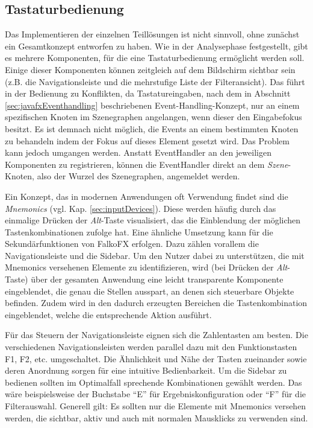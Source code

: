 \subsection{Tastaturbedienung} \label{sec:interactionKeyboard}
Das Implementieren der einzelnen Teillösungen ist nicht sinnvoll, ohne zunächst ein Gesamtkonzept entworfen zu haben. Wie in der Analysephase festgestellt, gibt es mehrere Komponenten, für die eine Tastaturbedienung ermöglicht werden soll. Einige dieser Komponenten können zeitgleich auf dem Bildschirm sichtbar sein (z.B. die Navigationsleiste und die mehrstufige Liste der Filteransicht). Das führt in der Bedienung zu Konflikten, da Tastatureingaben, nach dem in Abschnitt \ref{sec:javafxEventhandling} beschriebenen Event-Handling-Konzept, nur an einem spezifischen Knoten im Szenegraphen angelangen, wenn dieser den Eingabefokus besitzt. Es ist demnach nicht möglich, die Events an einem bestimmten Knoten zu behandeln indem der Fokus auf dieses Element gesetzt wird. Das Problem kann jedoch umgangen werden. Anstatt EventHandler an den jeweiligen Komponenten zu registrieren, können die EventHandler direkt an dem \textit{Szene}-Knoten, also der Wurzel des Szenegraphen, angemeldet werden.\par
{}
Ein Konzept, das in modernen Anwendungen oft Verwendung findet sind die \textit{Mnemonics} (vgl. Kap. \ref{sec:inputDevices}). Diese werden häufig durch das einmalige Drücken der \textit{Alt}-Taste visualisiert, das die Einblendung der möglichen Tastenkombinationen zufolge hat. Eine ähnliche Umsetzung kann für die Sekundärfunktionen von FalkoFX erfolgen. Dazu zählen vorallem die Navigationsleiste und die Sidebar. Um den Nutzer dabei zu unterstützen, die mit Mnemonics versehenen Elemente zu identifizieren, wird (bei Drücken der \textit{Alt}-Taste) über der gesamten Anwendung eine leicht transparente Komponente eingeblendet, die genau die Stellen ausspart, an denen sich steuerbare Objekte befinden. Zudem wird in den dadurch erzeugten Bereichen die Tastenkombination eingeblendet, welche die entsprechende Aktion ausführt.\par
Für das Steuern der Navigationsleiste eignen sich die Zahlentasten am besten. Die verschiedenen Navigationsleisten werden parallel dazu mit den Funktionstasten F1, F2, etc. umgeschaltet. Die Ähnlichkeit und Nähe der Tasten zueinander sowie deren Anordnung sorgen für eine intuitive Bedienbarkeit. Um die Sidebar zu bedienen sollten im Optimalfall sprechende Kombinationen gewählt werden. Das wäre beispielsweise der Buchstabe \enquote{E} für Ergebniskonfiguration oder \enquote{F} für die Filterauswahl. Generell gilt: Es sollten nur die Elemente mit Mnemonics versehen werden, die sichtbar, aktiv und auch mit normalen Mausklicks zu verwenden sind.\par
